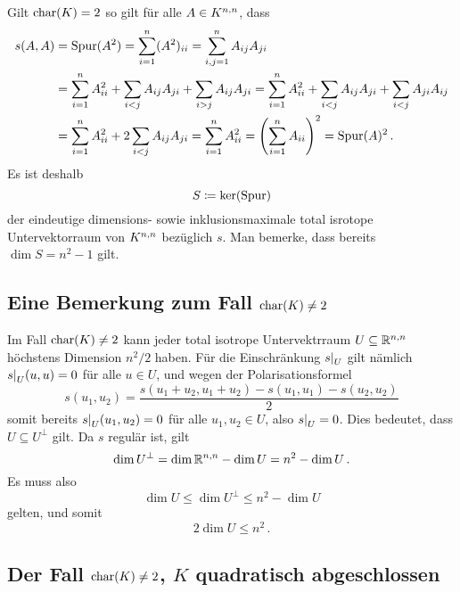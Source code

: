 Gilt $\ringchar(K) = 2$ so gilt für alle $A \in \matrices{n}{K}$, dass
\begin{align*}
      s(A,A)
  &=  \tr(A^2)
   =  \sum_{i=1}^n (A^2)_{ii}
   =  \sum_{i,j=1}^n A_{ij} A_{ji}
  \\
  &=    \sum_{i=1}^n A_{ii}^2
      + \sum_{i < j} A_{ij} A_{ji}
      + \sum_{i > j} A_{ij} A_{ji}
   =    \sum_{i=1}^n A_{ii}^2
      + \sum_{i < j} A_{ij} A_{ji}
      + \sum_{i < j} A_{ji} A_{ij}
  \\
  &=    \sum_{i=1}^n A_{ii}^2
      + 2\sum_{i < j} A_{ij} A_{ji}
   =  \sum_{i=1}^n A_{ii}^2
   =  \left( \sum_{i=1}^n A_{ii} \right)^2
   =  \tr(A)^2 \,.
\end{align*}
Es ist deshalb
\[
            S
  \defined  \ker(\tr)
\]
der eindeutige dimensions- sowie inklusionsmaximale total isrotope Untervektorraum von $\matrices{n}{K}$ bezüglich $s$.
Man bemerke, dass bereits $\dim S = n^2 - 1$ gilt.





\subsection*{Eine Bemerkung zum Fall $\ringchar(K) \neq 2$}

Im Fall $\ringchar(K) \neq 2$ kann jeder total isotrope Untervektrraum $U \subseteq \matrices{n}{\Real}$ höchstens Dimension $n^2/2$ haben.
Für die Einschränkung $\restrict{s}{U}$ gilt nämlich $\restrict{s}{U}(u,u) = 0$ für alle $u \in U$, und wegen der Polarisationsformel
\[
    s(u_1, u_2)
  = \frac{s(u_1 + u_2, u_1 + u_2) - s(u_1, u_1) - s(u_2,u_2)}{2}
\]
somit bereits $\restrict{s}{U}(u_1, u_2) = 0$ für alle $u_1, u_2 \in U$, also $\restrict{s}{U} = 0$.
Dies bedeutet, dass $U \subseteq U^\perp$ gilt.
Da $s$ regulär ist, gilt
\[
    \dim U^\perp
  = \dim \matrices{n}{\Real} - \dim U
  = n^2 - \dim U \,.
\]
Es muss also
\[
        \dim U
  \leq  \dim U^\perp
  \leq  n^2 - \dim U
\]
gelten, und somit
\[
        2 \dim U
  \leq  n^2 \,.
\]


\subsection*{Der Fall $\ringchar(K) \neq 2$, $K$ quadratisch abgeschlossen}

